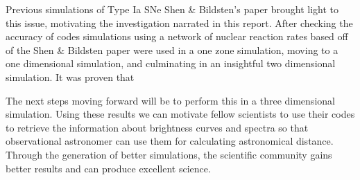\documentclass[preprint]{aastex62}
\begin{document}
  Previous simulations of Type Ia SNe %
  Shen \& Bildsten's paper brought light to this issue, motivating the investigation narrated in this report. After checking the accuracy of codes simulations using a network of nuclear reaction rates based off of the Shen \& Bildsten paper were used in a one zone simulation, moving to a one dimensional simulation, and culminating in an insightful two dimensional simulation. It was proven that %
  
  The next steps moving forward will be to perform this in a three dimensional simulation. Using these results we can motivate fellow scientists to use their codes to retrieve the information about brightness curves and spectra so that observational astronomer can use them for calculating astronomical distance. Through the generation of better simulations, the scientific community gains better results and can produce excellent science. 


\end{document}
